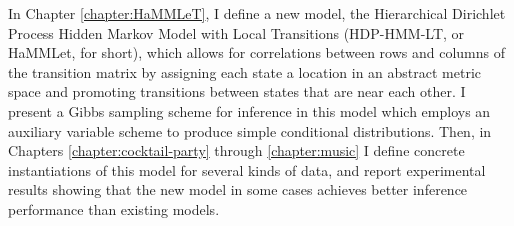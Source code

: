 In Chapter \ref{chapter:HaMMLeT}, I define a new model, the Hierarchical Dirichlet
Process Hidden Markov Model with Local Transitions (HDP-HMM-LT, or
HaMMLet, for short), which allows for correlations between rows and columns of the
transition matrix by assigning each state a location in an abstract metric 
space and promoting transitions between states
that are near each other.  I present a Gibbs sampling scheme
for inference in this model which employs an auxiliary variable scheme
to produce simple conditional distributions.  Then, in Chapters
\ref{chapter:cocktail-party} through \ref{chapter:music} I define
concrete instantiations of this model for several kinds of data, and
report experimental results showing that the new model in some cases
achieves better inference performance than existing models.



